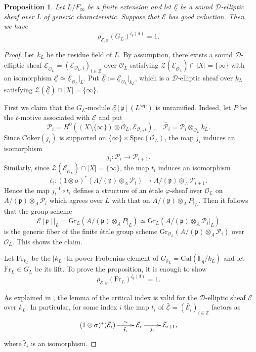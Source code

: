 \documentclass[10pt]{amsart}
\theoremstyle{plain}
\newtheorem{prop}[thm]{Proposition}
\theoremstyle{definition}
\newcommand{\Coker}{\mathrm{Coker}}
\newcommand{\Fr}{\mathrm{Fr}}
\newcommand{\Gal}{\mathrm{Gal}}
\newcommand{\sep}{\mathrm{sep}}
\newcommand{\Spec}{\mathrm{Spec}}
\newcommand{\cE}{\mathcal{E}}
\newcommand{\cO}{\mathcal{O}}
\newcommand{\cP}{\mathcal{P}}
\newcommand{\cZ}{\mathcal{Z}}
\newcommand{\Gr}{\mathrm{Gr}}
\newcommand{\ucE}{\underline{\mathcal{E}}}
\newcommand{\bF}{\mathbb{F}}
\newcommand{\bZ}{\mathbb{Z}}
\newcommand{\sD}{\mathscr{D}}
\newcommand{\frp}{\mathfrak{p}}
\begin{document}
\begin{prop}\label{PropControlInftyGoodRed}
	Let $L/F_\infty$ be a finite extension and let $\ucE$ be a sound $\sD$-elliptic sheaf over $L$ of generic characteristic.
	Suppose that $\ucE$ has good reduction.
	Then we have
	\[
	\rho_{\ucE,\frp}(G_{L})^{l_q(d)}=1.
	\]
\end{prop}
\begin{proof}
	Let $k_L$ be the residue field of $L$.
	By assumption,
	there exists a sound $\sD$-elliptic sheaf $\ucE_{\cO_{L}}=(\cE_{\cO_{L},i})_{i\in \bZ}$ over $\cO_{L}$
	satisfying $\cZ(\ucE_{\cO_{L}})\cap |X|=\{\infty\}$
	with an isomorphism $\ucE\simeq \ucE_{\cO_{L}}|_{L}$.
	Put $\bar{\ucE}:=\ucE_{\cO_{L}}|_{k_L}$, which is a $\sD$-elliptic sheaf over $k_L$ satisfying $\cZ(\bar{\ucE})\cap |X|=\{\infty\}$.
	
	
	
	First we claim that the $G_{L}$-module $\ucE[\frp](L^\sep)$ is unramified.
	Indeed, let $P$ be the $t$-motive associated with $\ucE$ and put
	\[
	\cP_i=H^0((X\setminus\{\infty\})\otimes \cO_{L},\cE_{\cO_{L},i}),\quad \bar{\cP}_i=\cP_i\otimes_{\cO_{L}}k_L.
	\]
	Since $\Coker(j_i)$ is supported on $\{\infty\}\times \Spec(\cO_{L})$, the map $j_i$ induces an isomorphism
	\[
	j_i: \cP_i\to  \cP_{i+1}.
	\]
	Similarly, since $\cZ(\ucE_{\cO_{L}})\cap |X|=\{\infty\}$, the map $t_i$ induces an isomorphism
	\[
	t_i: (1\otimes\sigma)^*(A/(\frp)\otimes_A \cP_i) \to A/(\frp)\otimes_A \cP_{i+1}.
	\]
	Hence the map $j_i^{-1}\circ t_i$ defines a structure of an \'{e}tale $\varphi$-sheaf over $\cO_{L}$ on $A/(\frp)\otimes_A \cP_i$ 
	which agrees over $L$ with 
	that on $A/(\frp)\otimes_A P|_{L}$. Then it follows that the group scheme 
	\[
	\ucE[\frp]|_{L}=\Gr_{L}(A/(\frp)\otimes_A P|_{L})\simeq \Gr_{L}(A/(\frp)\otimes_A \cP_i|_{L})
	\]
	is the generic fiber of the finite \'{e}tale group scheme $\Gr_{\cO_{L}}(A/(\frp)\otimes_A \cP_i)$ over $\cO_{L}$. This shows the claim.
	
	
	Let $\Fr_{k_L}$ be the $|k_L|$-th power Frobenius element of $G_{k_L}=\Gal(\bar{\bF}_q/k_L)$
	and let $\Fr_L\in G_{L}$ be its lift. To prove the proposition, it is enough to show 
	\[
	\rho_{\ucE,\frp}(\Fr_L)^{l_q(d)}=1.
	\]
	
	As explained in \cite[p.~170]{BS}, the lemma of the critical index \cite[Lemma 3.3.1]{BS} is valid for 
	the $\sD$-elliptic sheaf $\bar{\ucE}$ over $k_L$. In particular, for some index $i$ the map $t_i$ of $\bar{\ucE}=(\bar{\cE}_i)_{i\in \bZ}$ factors as
	\[
	\xymatrix{
		(1\otimes\sigma)^*(\bar{\cE}_i)\ar[r]_-{\tilde{t}_i}^-{\sim} &\bar{\cE}_i \ar[r]_-{j_i}& \bar{\cE}_{i+1},
	}
	\]
	where $\tilde{t}_i$ is an isomorphism.
	

\end{proof}
\end{document}
